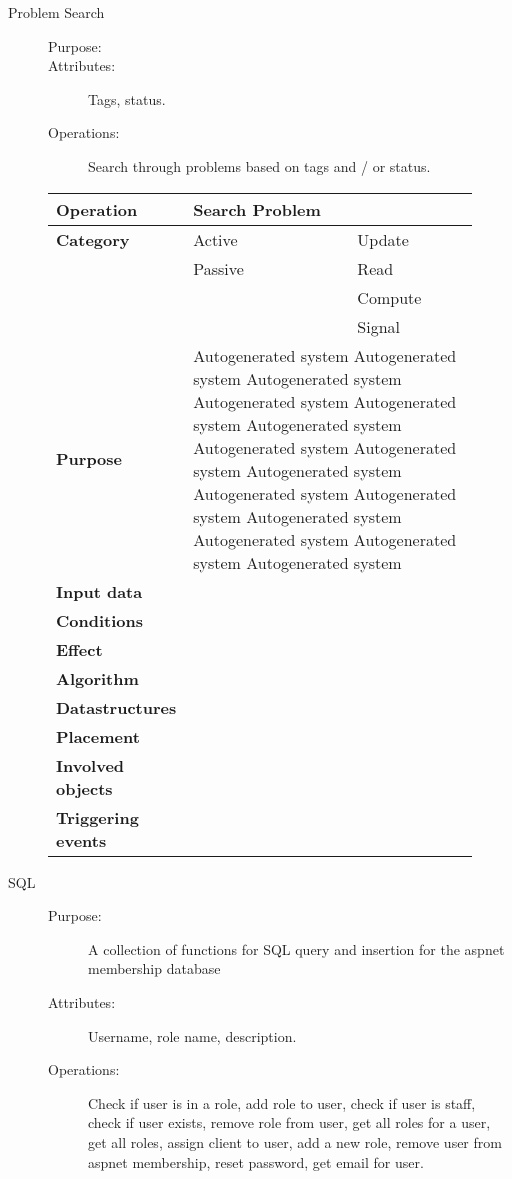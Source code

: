 \begin{description}
\item[Problem Search]\hfill
\begin{description}
\item[Purpose:]
\item[Attributes:]Tags, status.
\item[Operations:]Search through problems based on tags and / or status.
\end{description}
\end{description}

\begin{figure}
\begin{tabular}{p{3.5cm} p{4cm} p{4cm}}
\hline
\textbf{Operation}&Search Problem\\
\hline
\textbf{Category}&\underline{ }Active&\underline{ }Update\\
&\underline{ }Passive&\underline{ }Read\\
&&\underline{ }Compute\\
&&\underline{ }Signal\\
\textbf{Purpose}&\multicolumn{2}{p{8cm}}{Autogenerated system Autogenerated system Autogenerated system Autogenerated system Autogenerated system Autogenerated system
Autogenerated system Autogenerated system Autogenerated system Autogenerated system Autogenerated system Autogenerated system 
Autogenerated system Autogenerated system Autogenerated system}\\
\textbf{Input data}&\multicolumn{2}{p{8cm}}{}\\
\textbf{Conditions}&\multicolumn{2}{p{8cm}}{}\\
\textbf{Effect}&\multicolumn{2}{p{8cm}}{}\\
\textbf{Algorithm}&\multicolumn{2}{p{8cm}}{}\\
\textbf{Datastructures}&\multicolumn{2}{p{8cm}}{}\\
\textbf{Placement}&\multicolumn{2}{p{8cm}}{}\\
\textbf{Involved objects}&\multicolumn{2}{p{8cm}}{}\\
\textbf{Triggering events}&\multicolumn{2}{p{8cm}}{}\\
\hline
\end{tabular}
\end{figure}

\begin{description}
\item[SQL]\hfill
\begin{description}
\item[Purpose:]A collection of functions for SQL query and insertion for the aspnet membership database
\item[Attributes:]Username, role name, description.
\item[Operations:]Check if user is in a role, add role to user, check if user is staff, check if user exists, remove role from user, get all roles for a user, get all roles, assign client to user, add a new role, remove user from aspnet membership, reset password, get email for user.
\end{description}
\end{description}